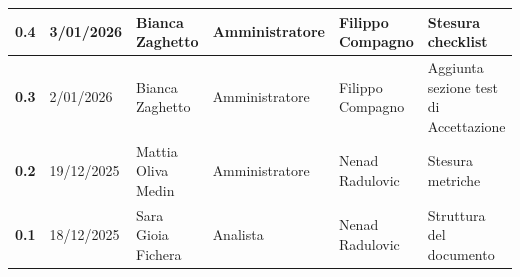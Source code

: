\documentclass[a4paper,12pt]{article}
\begin{document}
\begin{xltabular}{\textwidth}{|l|l|X|l|X|X|}
                \hline
                \textbf{0.4} & 3/01/2026 & Bianca Zaghetto & Amministratore & Filippo Compagno & Stesura checklist \\
                \hline
                \textbf{0.3} & 2/01/2026 & Bianca Zaghetto & Amministratore & Filippo Compagno & Aggiunta sezione test di Accettazione \\
                \hline
                \textbf{0.2} & 19/12/2025 & Mattia Oliva Medin & Amministratore & Nenad Radulovic & Stesura metriche\\
                \hline
                \textbf{0.1} & 18/12/2025 & Sara Gioia Fichera & Analista & Nenad Radulovic & Struttura del documento \\
                \hline
    \end{xltabular}
    \newpage
    
    \tableofcontents
    \newpage

    \listoffigures
    \newpage

    \listoftables
    \newpage
    
\end{document}
